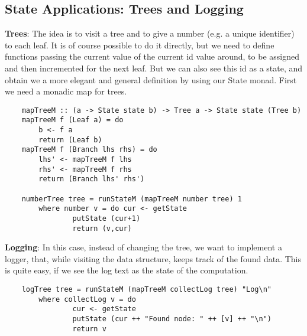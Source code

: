 \subsection{State Applications: Trees and Logging}
\textbf{Trees}:
The idea is to visit a tree and to give a number (e.g. a unique identifier) to each leaf.
It is of course possible to do it directly, but we need to define functions passing the current value of the current id value around, to be assigned and then incremented for the next leaf.
But we can also see this id as a state, and obtain we a more elegant and general definition by using our State monad.
First we need a monadic map for trees.
\begin{lstlisting}
	mapTreeM :: (a -> State state b) -> Tree a -> State state (Tree b)
	mapTreeM f (Leaf a) = do
		b <- f a
		return (Leaf b)
	mapTreeM f (Branch lhs rhs) = do
		lhs' <- mapTreeM f lhs
		rhs' <- mapTreeM f rhs
		return (Branch lhs' rhs')
	
	numberTree tree = runStateM (mapTreeM number tree) 1
		where number v = do cur <- getState
				putState (cur+1)
				return (v,cur)
\end{lstlisting}
\textbf{Logging}:
In this case, instead of changing the tree, we want to implement a logger, that, while visiting the data structure, keeps track of the found data.
This is quite easy, if we see the log text as the state of the computation.
\begin{lstlisting}
	logTree tree = runStateM (mapTreeM collectLog tree) "Log\n"
		where collectLog v = do
				cur <- getState
				putState (cur ++ "Found node: " ++ [v] ++ "\n")
				return v
\end{lstlisting}